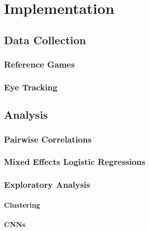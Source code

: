﻿\chapter{Implementation}

\section{Data Collection}
\label{sec:data}

\subsection{Reference Games}
\label{sec:data:ref_games}

\subsection{Eye Tracking}
\label{sec:data:eyetr}

\section{Analysis}
\label{sec:analysis}

\subsection{Pairwise Correlations}
\label{sec:analysis:corr}

\subsection{Mixed Effects Logistic Regressions}
\label{sec:analysis:mixed_effects}

\subsection{Exploratory Analysis}
\label{sec:analysis:exploratory}

\subsubsection{Clustering}
\label{sec:analysis:exploratory:clustering}

\subsubsection{CNNs}
\label{sec:analysis:exploratory:cnn}
